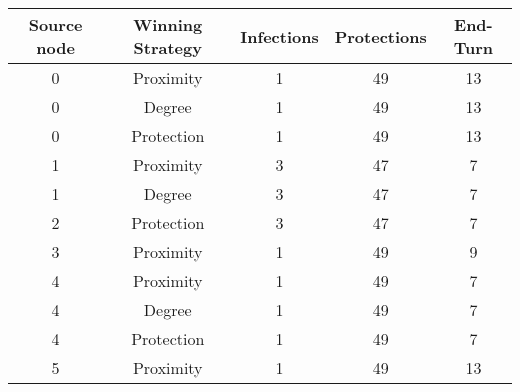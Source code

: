 \documentclass[results.tex]{subfiles}
\begin{document}
    \begin{center}
        \begin{tabular}{| c || c | c | c | c |}
            \hline
            {\bfseries Source node} & {\bfseries Winning Strategy} & {\bfseries Infections} & {\bfseries Protections}
            & {\bfseries End-Turn}
            \\  %
            \hline\hline
            0                       & Proximity                    & 1                      & 49                      & 13                   \\
            \hline
            0                       & Degree                       & 1                      & 49                      & 13                   \\
            \hline
            0                       & Protection                   & 1                      & 49                      & 13                   \\
            \hline
            1                       & Proximity                    & 3                      & 47                      & 7                    \\
            \hline
            1                       & Degree                       & 3                      & 47                      & 7                    \\
            \hline
            2                       & Protection                   & 3                      & 47                      & 7                    \\
            \hline
            3                       & Proximity                    & 1                      & 49                      & 9                    \\
            \hline
            4                       & Proximity                    & 1                      & 49                      & 7                    \\
            \hline
            4                       & Degree                       & 1                      & 49                      & 7                    \\
            \hline
            4                       & Protection                   & 1                      & 49                      & 7                    \\
            \hline
            5                       & Proximity                    & 1                      & 49                      & 13                   \\

\end{tabular}
\end{center}
\end{document}
